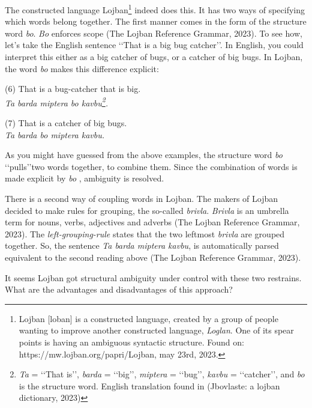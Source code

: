 The constructed language Lojban\footnote{Lojban [lo\textyogh ban] is a constructed language, created by a group of people wanting to improve another constructed language, {\it Loglan}. One of its spear points is having an ambiguous syntactic structure. Found on: https://mw.lojban.org/papri/Lojban, may 23rd, 2023.} indeed does this. It has two ways of specifying which words belong together. The first manner comes in the form of the structure word {\it bo}. \def\bo{{\it bo} } {\it Bo} enforces scope (The Lojban Reference Grammar, 2023). To see how, let's take the English sentence \lq\lq That is a big bug catcher\rq\rq. In English, you could interpret this either as a big catcher of bugs, or a catcher of big bugs. In Lojban, the word \bo makes this difference explicit:


\begin{center}
	{\center (6) That is a bug-catcher that is big.\\ {\it Ta barda miptera bo kavbu\footnote{{\it Ta} = \lq\lq That is\rq\rq, {\it barda} = \lq\lq big\rq\rq, {\it miptera} = \lq\lq bug\rq\rq, {\it kavbu} = \lq\lq catcher\rq\rq, and \bo is the structure word. English translation found in  (Jbovlaste: a lojban dictionary, 2023)}.}}

{\center (7) That is a catcher of big bugs. \\}
{\it Ta barda bo miptera kavbu.}
\end{center}
\vspace{0.1cm}

\noindent As you might have guessed from the above examples, the structure word \bo \lq\lq pulls\rq\rq two words together, to combine them. Since the combination of words is made explicit by \bo, ambiguity is resolved. 

There is a second way of coupling words in Lojban. The makers of Lojban decided to make rules for grouping, the so-called {\it brivla}. {\it Brivla} is an umbrella term for nouns, verbs, adjectives and adverbs (The Lojban Reference Grammar, 2023). The {\it left-grouping-rule} states that the two leftmost {\it brivla} are grouped together. So, the sentence {\it Ta barda miptera kavbu}, is automatically parsed equivalent to the second reading above (The Lojban Reference Grammar, 2023). 

It seems Lojban got structural ambiguity under control with these two restrains. What are the advantages and disadvantages of this approach?

